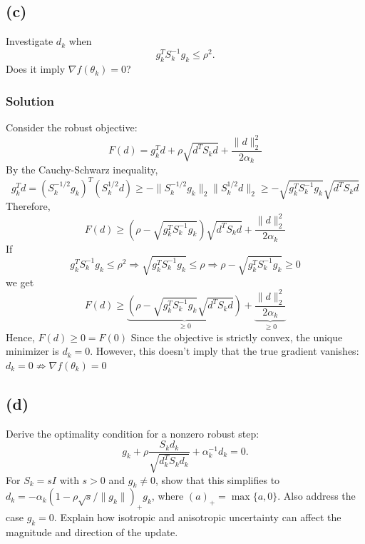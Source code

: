 \subsection{(c)}
Investigate $d_k$ when $$g^T_k S^{-1}_k g_k \leq \rho^2.$$ Does it imply $\nabla f(\theta_k) = 0$?
\subsubsection{Solution}
Consider the robust objective:
$$F(d) = g^T_k d + \rho \sqrt{d^T S_k d} + \frac{\|d\|^2_2}{2 \alpha_k}$$
By the Cauchy-Schwarz inequality,
$$g^T_k d = (S^{-1/2}_k g_k)^T (S^{1/2}_k d) \geq - \|S^{-1/2}_k g_k\|_2 \|S^{1/2}_k d\|_2 \geq -\sqrt{g^T_k S^{-1}_k g_k} \sqrt{d^T S_k d}$$
Therefore,
$$F(d) \geq \left(\rho - \sqrt{g^T_k S^{-1}_k g_k}\right) \sqrt{d^T S_k d} + \frac{\|d\|^2_2}{2 \alpha_k}$$
If 
$$g^T_k S^{-1}_k g_k \leq \rho^2 \Rightarrow \sqrt{g^T_k S^{-1}_k g_k} \leq \rho \Rightarrow \rho - \sqrt{g^T_k S^{-1}_k g_k} \geq 0$$ 
we get
$$F(d) \geq \underbrace{\left(\rho - \sqrt{g^T_k S^{-1}_k g_k} \sqrt{d^T S_k d}\right)}_{\geq 0} + \underbrace{\frac{\|d\|^2_2}{2 \alpha_k}}_{\geq 0}$$
Hence, $F(d) \geq 0 = F(0)$
Since the objective is strictly convex, the unique minimizer is $d_k = 0$.
However, this doesn't imply that the true gradient vanishes: $d_k = 0 \not \Rightarrow \nabla f(\theta_k) = 0$

\subsection{(d)}
Derive the optimality condition for a nonzero robust step: $$g_k + \rho \frac{S_k d_k}{\sqrt{d^T_k S_k d_k}} + \alpha^{-1}_k d_k = 0.$$ For $S_k = s I$ with $s > 0$ and $g_k \neq 0$, show that this simplifies to $d_k = -\alpha_k (1 - \rho \sqrt{s} / \|g_k\|)_+ g_k$, where $(a)_+ = \max\{a, 0\}$. Also address the case $g_k = 0$. Explain how isotropic and anisotropic uncertainty can affect the magnitude and direction of the update.
